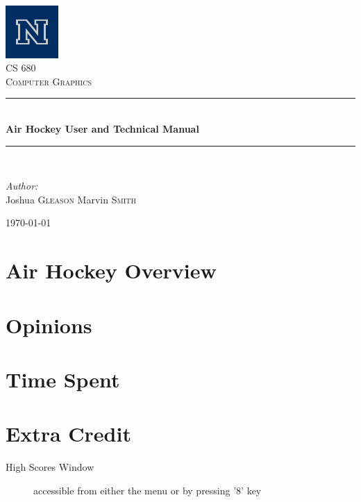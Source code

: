 \documentclass[10pt]{report}
\newcommand{\HRule}{\rule{\linewidth}{0.5mm}}
\begin{document}
\begin{titlepage}
\begin{center}
\includegraphics[width=0.15\textwidth]{logo.jpg}\\[2cm]    
\textsc{\LARGE CS 680}\\[1.5cm]

\textsc{\Large Computer Graphics}\\[0.5cm]


\HRule \\[0.4cm]
{ \huge \bfseries Air Hockey User and Technical Manual}\\[0.4cm]

\HRule \\[1.5cm]

\begin{minipage}{0.4\textwidth}
\begin{center} \large
\emph{Author:}\\
Joshua \textsc{Gleason}
Marvin \textsc{Smith}
\end{center}
\end{minipage}
\vfill
{\large \today}
\end{center}
\end{titlepage}
\newpage

\section*{Air Hockey Overview}


\section*{Opinions}


\section*{Time Spent}



\section*{Extra Credit}
\begin{description}
\item[High Scores Window] accessible from either the menu or by pressing '8' key
\end{description}
\end{document}
